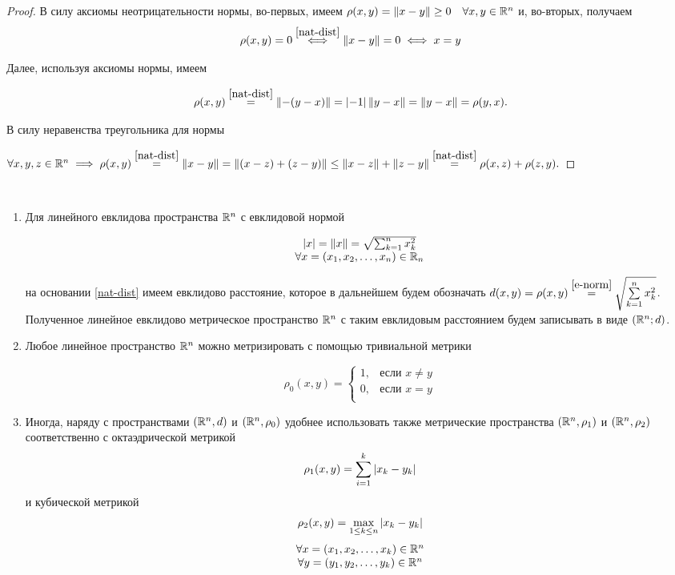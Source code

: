 \documentclass[../../main.tex]{subfiles}
\begin{document}
\begin{proof}
 В силу аксиомы неотрицательности нормы, во-первых, имеем $\rho(x, y) 
 = \lVert{x-y}\rVert \ge 0 \quad \forall x, y \in \mathbb{R}^n$ и, во-вторых, получаем
 \[\rho(x, y) = 0 \stackrel{\eqref{nat-dist}}{\iff} \lVert{x-y}\rVert = 0 
  \iff x = y\]
 
 Далее, используя аксиомы нормы, имеем
 
 \[\rho(x, y) \stackrel{\eqref{nat-dist}}{=} \lVert{-(y-x)}\rVert =
   \left|{-1}\right|\lVert{y-x}\rVert = \lVert{y-x}\rVert = \rho(y, x).\]
 
 В силу неравенства треугольника для нормы
 
 $\forall x, y, z \in \R^n \implies \rho(x, y) \stk{nat-dist}{=} 
  \norm{x-y} = \norm{(x-z) + (z-y)} \le
  \norm{x-z} + \norm{z-y} \stk{nat-dist}{=} \rho(x, z) +  \rho(z, y).$
\end{proof}

\begin{rems} 

 \

 \begin{enumerate}
  \item  Для линейного евклидова пространства $\mathbb{R}^n$ с евклидовой
  нормой
  
  \begin{equation}
   \label{e-norm}
   \begin{array}{c}
    \left|{x}\right| = \lVert{x}\rVert = \sqrt{\sum_{k=1}^n x_k^2} \\
    \forall x = (x_1, x_2, \dots, x_n) \in \mathbb{R}_n
   \end{array}
  \end{equation}
  
  на основании \eqref{nat-dist} имеем евклидово расстояние, которое
  в дальнейшем будем обозначать $d(x, y) = \rho(x, y) \stk{e-norm}{=}
  \sqrt{\sum\limits_{k=1}^n x_k^2}$. Полученное линейное евклидово 
  метрическое пространство $\mathbb{R}^n$ с таким евклидовым расстоянием 
  будем записывать в виде $(\mathbb{R}^n; d)$.
  
  \item Любое линейное пространство $\mathbb{R}^n$ можно метризировать с
  помощью тривиальной метрики
  
  \[
   \rho_0(x, y) =
   \begin{cases}
    1, & \text{если } x \ne y \\
    0, & \text{если } x = y \\
   \end{cases}
  \]
  
  \item Иногда, наряду с пространствами $(\mathbb{R}^n, d)$ и $(\mathbb{R}^n, \rho_0)$
  удобнее использовать также метрические пространства $(\mathbb{R}^n, \rho_1)$
  и $(\mathbb{R}^n, \rho_2)$ соответственно с октаэдрической метрикой
  \[\rho_1(x, y) = \sum_{i=1}^k \left|{x_k - y_k}\right|\]
  и кубической метрикой
  \[\rho_2(x, y) = \max_{1 \le k \le n} \left|{x_k - y_k}\right|\]
  \[\begin{array}{c}
     \forall x = (x_1, x_2, \dots, x_k) \in \mathbb{R}^n \\
     \forall y = (y_1, y_2, \dots, y_k) \in \mathbb{R}^n \\
    \end{array}\]
 \end{enumerate}

\end{rems}
\end{document}
